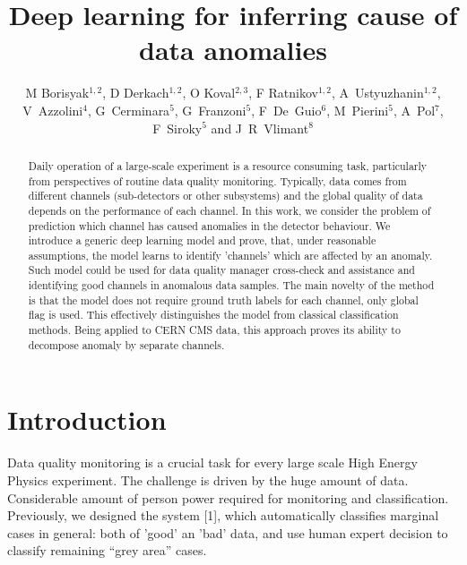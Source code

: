 \documentclass[a4paper]{jpconf}
\begin{document}
\title{Deep learning for inferring cause of data anomalies}

\author{M Borisyak$^{1,2}$, D Derkach$^{1,2}$, O Koval$^{2,3}$, F Ratnikov$^{1,2}$, A~Ustyuzhanin$^{1,2}$, V~Azzolini$^4$, G~Cerminara$^5$, G~Franzoni$^5$, F~De~Guio$^6$, M~Pierini$^5$, A~Pol$^7$, F~Siroky$^5$ and J~R~Vlimant$^8$}

\address{$^1$ NRE Higher School of Economics, Moscow, Russia \\
$^2$ Yandex School of Data Analysis, Moscow, Russia \\
$^3$ Skolkovo Institute of Science and Technology, Moscow, Russia \\
$^4$ Massachusetts Institute of Technology, Cambridge, USA \\
$^5$ CERN, European Organization for Nuclear Research, Geneva, Switzerland \\
$^6$ Texas Tech University, Lubbock, USA \\
$^7$ University of Paris-Saclay, Paris, France \\
$^8$ California Institute of Technology, Pasadena, USA}




\begin{abstract} 
Daily operation of a large-scale experiment is a resource consuming task, particularly from perspectives of routine data quality monitoring. Typically, data comes from different channels (sub-detectors or other subsystems) and the global quality of data depends on the performance of each channel. In this work, we consider the problem of prediction which channel has caused anomalies in the detector behaviour.
We introduce a generic deep learning model and prove, that, under reasonable assumptions, the model learns to identify 'channels' which are affected by an anomaly. Such model could be used for data quality manager cross-check and assistance and identifying good channels in anomalous data samples.
The main novelty of the method is that the model does not require ground truth labels for each channel, only global flag is used. This effectively distinguishes the model from classical classification methods. Being applied to CERN CMS data,  this approach proves its ability to decompose anomaly by separate channels. 
\end{abstract}




\section{Introduction}
Data quality monitoring is a crucial task for every large scale High Energy Physics experiment.
The challenge is driven by the huge amount of data. Considerable amount of person power
required for monitoring and classification. Previously, we designed the system [1], which automatically classifies marginal cases in general: both of 'good' an 'bad' data, and use human expert decision to classify remaining “grey area” cases. 
\end{document}
